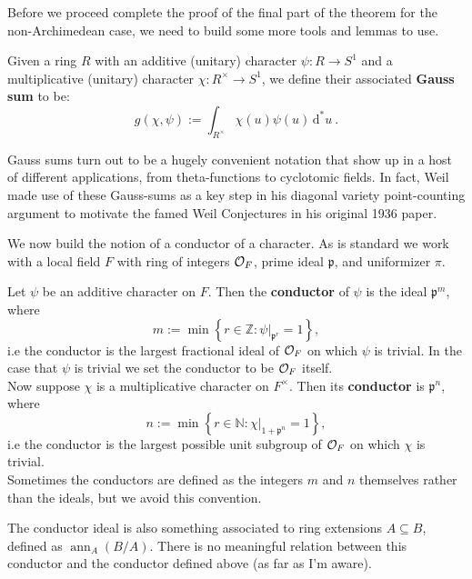 \documentclass[11pt, x11names]{article}
\newcommand{\nn}{\mathbb{N}}
\newcommand{\zz}{\mathbb{Z}}
\newcommand{\pp}{\mathfrak{p}}
\newcommand{\set}[1]{\left\{ #1 \right\}}
\DeclareMathOperator{\ann}{ann}
\renewcommand{\d}[1]{\, \mathrm{d}#1 \ }
\begin{document}
Before we proceed complete the proof of the final part of the theorem for the non-Archimedean case, we need to build some more tools and lemmas to use.
\begin{defn}
    \label{def: Gauss sum}
    Given a ring $R$ with an additive (unitary) character $\psi: R \to S^1$ and a multiplicative (unitary) character $\chi: R^\times \to S^1$, we define their associated \textbf{Gauss sum} to be:
    \begin{equation*}
        g(\chi, \psi) := \int_{R^\times} \chi(u) \psi(u) \d{^*u}.
    \end{equation*}
    \end{defn}
    \begin{remark}
        Gauss sums turn out to be a hugely convenient notation that show up in a host of different applications, from theta-functions to cyclotomic fields. In fact, Weil made use of these Gauss-sums as a key step in his diagonal variety point-counting argument to motivate the famed Weil Conjectures in his original 1936 paper.
    \end{remark}


We now build the notion of a conductor of a character. As is standard we work with a local field $F$ with ring of integers $\mathcal{O}_F$, prime ideal $\pp$, and  uniformizer $\pi$.
\begin{defn}
\label{def: conductor}
Let $\psi$ be an additive character on $F$. Then the \textbf{conductor} of $\psi$ is the ideal $\pp^m$, where 
\begin{equation*}
    m := \min \set{r \in \zz : \psi \vert_{\pp^r} = 1},
\end{equation*}
i.e the conductor is the largest fractional ideal of $\mathcal{O}_F$ on which $\psi$ is trivial. In the case that $\psi$ is trivial we set the conductor to be $\mathcal{O}_F$ itself.\\

Now suppose $\chi$ is a multiplicative character on $F^\times$. Then its \textbf{conductor} is $\pp^n$, where
\begin{equation*}
    n := \min \set{r \in \nn : \chi \vert_{1 + \pp^n} = 1},
\end{equation*}
i.e the conductor is the largest possible unit subgroup of $\mathcal{O}_F$ on which $\chi$ is trivial.\\

Sometimes the conductors are defined as the integers $m$ and $n$ themselves rather than the ideals, but we avoid this convention.
\end{defn}
\begin{warning}
    The conductor ideal is also something associated to ring extensions $A \subseteq B$, defined as $\ann_A(B/A)$. There is no meaningful relation between this conductor and the conductor defined above (as far as I'm aware).
\end{warning}
\end{document}
